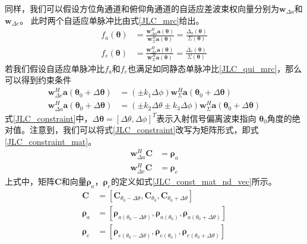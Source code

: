 \documentclass[master]{thesis-uestc}
\begin{document}
同样，我们可以假设方位角通道和俯仰角通道的自适应差波束权向量分别为$\bm{w}_{\Delta a}$和$\bm{w}_{\Delta e}$。
此时两个自适应单脉冲比由式\eqref{JLC_mrc}给出。
\begin{subequations}\label{JLC_mrc}
    \begin{align}
        f_{a}(\bm{\theta}) &= \frac{\bm{w}_{\Delta a}^H\bm{a}(\bm{\theta})}{\bm{w}_{\Sigma}^H\bm{a}(\bm{\theta})}
        = \frac{\Delta_a(\bm{\theta})}{\Sigma(\bm{\theta})} \\
        f_{e}(\bm{\theta}) &= \frac{\bm{w}_{\Delta e}^H\bm{a}(\bm{\theta})}{\bm{w}_{\Sigma}^H\bm{a}(\bm{\theta})}
        = \frac{\Delta_e(\bm{\theta})}{\Sigma(\bm{\theta})}
    \end{align}
\end{subequations}
若我们假设自适应单脉冲比$f_a$和$f_e$也满足如同静态单脉冲比\eqref{JLC_qui_mrc}，那么可以得到约束条件
\begin{subequations}\label{JLC_constraint}
    \begin{align}
        \bm{w}^H_{\Delta e}\bm{a}(\bm{\theta}_0+\Delta\bm{\theta}) &= 
        \left(\pm k_1\Delta\phi\right)\bm{w}^H_\Sigma\bm{a}(\bm{\theta}_0+\Delta\bm{\theta}) \\
        \bm{w}^H_{\Delta a}\bm{a}(\bm{\theta}_0+\Delta\bm{\theta}) &= 
        \left(\pm k_2\Delta\theta\pm k_3\Delta\phi\right)\bm{w}^H_\Sigma\bm{a}(\bm{\theta}_0+\Delta\bm{\theta})
    \end{align}
\end{subequations}
式\eqref{JLC_constraint}中，$\Delta\bm{\theta}=\left[\Delta\theta,\Delta\phi\right]^T$表示入射信号偏离波束指向
$\bm{\theta}_0$角度的绝对值。注意到，我们可以将式\eqref{JLC_constraint}改写为矩阵形式，即式\eqref{JLC_constraint_mat}。
\begin{subequations}\label{JLC_constraint_mat}
    \begin{align}
        \bm{w}^H_{\Delta a}\bm{C} &= \bm{\rho}_a \\
        \bm{w}^H_{\Delta e}\bm{C} &= \bm{\rho}_e
    \end{align}
\end{subequations}
上式中，矩阵$\bm{C}$和向量$\bm{\rho}_a$，$\bm{\rho}_e$的定义如式\eqref{JLC_const_mat_nd_vec}所示。
\begin{subequations}\label{JLC_const_mat_nd_vec}
    \begin{align}
        \bm{C} &= \left[\bm{C}_{\theta_0-\Delta\theta},\bm{C}_{\theta_0},\bm{C}_{\theta_0+\Delta\theta}\right] \\
        \bm{\rho}_a &= \left[\bm{\rho}_{a(\theta_0-\Delta\theta)},
        \bm{\rho}_{a(\theta_0)},\bm{\rho}_{a(\theta_0+\Delta\theta)}\right] \\
        \bm{\rho}_e &= \left[\bm{\rho}_{e(\theta_0-\Delta\theta)},
        \bm{\rho}_{e(\theta_0)},\bm{\rho}_{e(\theta_0+\Delta\theta)}\right]
    \end{align}
\end{subequations}
\end{document}

